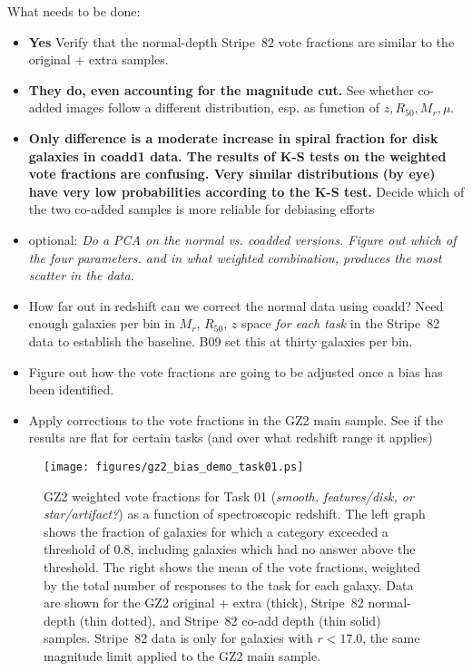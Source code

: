 \documentclass[useAMS,usenatbib]{mn2e}
\begin{document}
What needs to be done:
\begin{itemize}
	\item {\bf Yes} Verify that the normal-depth Stripe~82 vote fractions are similar to the original + extra samples. 
	\item {\bf They do, even accounting for the magnitude cut.} See whether co-added images follow a different distribution, esp. as function of $z, R_{50}, M_r, \mu$.
	\item {\bf Only difference is a moderate increase in spiral fraction for disk galaxies in coadd1 data. The results of K-S tests on the weighted vote fractions are confusing. Very similar distributions (by eye) have very low probabilities according to the K-S test.} Decide which of the two co-added samples is more reliable for debiasing efforts
	\item optional: {\it Do a PCA on the normal vs. coadded versions. Figure out which of the four parameters. and in what weighted combination, produces the most scatter in the data. }
	\item How far out in redshift can we correct the normal data using coadd? Need enough galaxies per bin in $M_r$, $R_{50}$, $z$ space {\em for each task} in the Stripe~82 data to establish the baseline. B09 set this at thirty galaxies per bin. 
	\item Figure out how the vote fractions are going to be adjusted once a bias has been identified. 
	\item Apply corrections to the vote fractions in the GZ2 main sample. See if the results are flat for certain tasks (and over what redshift range it applies)
\end{itemize}

\begin{figure*}
\texttt{[image: figures/gz2\_bias\_demo\_task01.ps]}
\caption{GZ2 weighted vote fractions for Task 01 ({\it smooth, features/disk, or star/artifact?}) as a function of spectroscopic redshift. The left graph shows the fraction of galaxies for which a category exceeded a threshold of 0.8, including galaxies which had no answer above the threshold. The right shows the mean of the vote fractions, weighted by the total number of responses to the task for each galaxy. Data are shown for the GZ2 original + extra (thick), Stripe~82 normal-depth (thin dotted), and Stripe~82 co-add depth (thin solid) samples. Stripe~82 data is only for galaxies with $r < 17.0$, the same magnitude limit applied to the GZ2 main sample.  
\label{fig-task01}}
\end{figure*}
\end{document}
